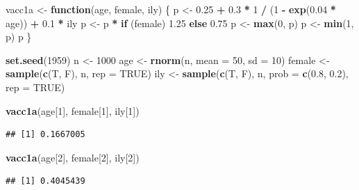 \documentclass[]{book}
\newenvironment{Shaded}{\begin{snugshade}}{\end{snugshade}}
\newcommand{\KeywordTok}[1]{\textcolor[rgb]{0.13,0.29,0.53}{\textbf{#1}}}
\newcommand{\DataTypeTok}[1]{\textcolor[rgb]{0.13,0.29,0.53}{#1}}
\newcommand{\DecValTok}[1]{\textcolor[rgb]{0.00,0.00,0.81}{#1}}
\newcommand{\FloatTok}[1]{\textcolor[rgb]{0.00,0.00,0.81}{#1}}
\newcommand{\StringTok}[1]{\textcolor[rgb]{0.31,0.60,0.02}{#1}}
\newcommand{\OtherTok}[1]{\textcolor[rgb]{0.56,0.35,0.01}{#1}}
\newcommand{\ControlFlowTok}[1]{\textcolor[rgb]{0.13,0.29,0.53}{\textbf{#1}}}
\newcommand{\OperatorTok}[1]{\textcolor[rgb]{0.81,0.36,0.00}{\textbf{#1}}}
\newcommand{\NormalTok}[1]{#1}
\theoremstyle{definition}
\theoremstyle{definition}
\theoremstyle{definition}
\theoremstyle{remark}
\begin{document}
\begin{Shaded}
\begin{Highlighting}[]
\NormalTok{vacc1a <-}\StringTok{ }\ControlFlowTok{function}\NormalTok{(age, female, ily) \{}
\NormalTok{  p <-}\StringTok{ }\FloatTok{0.25} \OperatorTok{+}\StringTok{ }\FloatTok{0.3} \OperatorTok{*}\StringTok{ }\DecValTok{1} \OperatorTok{/}\StringTok{ }\NormalTok{(}\DecValTok{1} \OperatorTok{-}\StringTok{ }\KeywordTok{exp}\NormalTok{(}\FloatTok{0.04} \OperatorTok{*}\StringTok{ }\NormalTok{age)) }\OperatorTok{+}\StringTok{ }\FloatTok{0.1} \OperatorTok{*}\StringTok{ }\NormalTok{ily}
\NormalTok{  p <-}\StringTok{ }\NormalTok{p }\OperatorTok{*}\StringTok{ }\ControlFlowTok{if}\NormalTok{ (female) }\FloatTok{1.25} \ControlFlowTok{else} \FloatTok{0.75}
\NormalTok{  p <-}\StringTok{ }\KeywordTok{max}\NormalTok{(}\DecValTok{0}\NormalTok{, p)}
\NormalTok{  p <-}\StringTok{ }\KeywordTok{min}\NormalTok{(}\DecValTok{1}\NormalTok{, p)}
\NormalTok{  p}
\NormalTok{\}}

\KeywordTok{set.seed}\NormalTok{(}\DecValTok{1959}\NormalTok{)}
\NormalTok{n <-}\StringTok{ }\DecValTok{1000}
\NormalTok{age <-}\StringTok{ }\KeywordTok{rnorm}\NormalTok{(n, }\DataTypeTok{mean =} \DecValTok{50}\NormalTok{, }\DataTypeTok{sd =} \DecValTok{10}\NormalTok{)}
\NormalTok{female <-}\StringTok{ }\KeywordTok{sample}\NormalTok{(}\KeywordTok{c}\NormalTok{(T, F), n, }\DataTypeTok{rep =} \OtherTok{TRUE}\NormalTok{)}
\NormalTok{ily <-}\StringTok{ }\KeywordTok{sample}\NormalTok{(}\KeywordTok{c}\NormalTok{(T, F), n, }\DataTypeTok{prob =} \KeywordTok{c}\NormalTok{(}\FloatTok{0.8}\NormalTok{, }\FloatTok{0.2}\NormalTok{), }\DataTypeTok{rep =} \OtherTok{TRUE}\NormalTok{)}

\KeywordTok{vacc1a}\NormalTok{(age[}\DecValTok{1}\NormalTok{], female[}\DecValTok{1}\NormalTok{], ily[}\DecValTok{1}\NormalTok{])}
\end{Highlighting}
\end{Shaded}

\begin{verbatim}
## [1] 0.1667005
\end{verbatim}

\begin{Shaded}
\begin{Highlighting}[]
\KeywordTok{vacc1a}\NormalTok{(age[}\DecValTok{2}\NormalTok{], female[}\DecValTok{2}\NormalTok{], ily[}\DecValTok{2}\NormalTok{])}
\end{Highlighting}
\end{Shaded}

\begin{verbatim}
## [1] 0.4045439
\end{verbatim}
\end{document}
